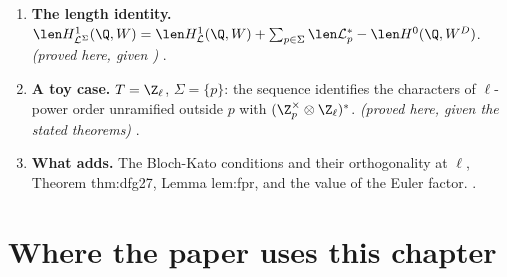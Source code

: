 \begin{sloppypar}
\begin{enumerate}[label=\textbf{\thechapter.\arabic*}]
$H^0(\Q_p,V^D)=0$ for one $p\in\Sigma$, then $0\to H^1_{\mathcal L}(\Q,W)\to H^1_{\mathcal L^\Sigma}(\Q,W)\to\bigoplus_{p\in\Sigma\cup\{\infty\}}(\mathcal L^*_p)^*\to H^0(\Q,W^D)^*\to0$.
\emph{(proved here, given )} .
\item \textbf{The length identity.} $\len H^1_{\mathcal L^\Sigma}(\Q,W)=\len H^1_{\mathcal L}(\Q,W)+\sum_{p\in\Sigma}\len\mathcal L^*_p-\len H^0(\Q,W^D)$. \emph{(proved here, given
)} .
\item \textbf{A toy case.} $T=\Z_\ell$, $\Sigma=\{p\}$: the sequence identifies the characters of $\ell$-power order unramified outside $p$ with $(\Z_p^\times\otimes\Z_\ell)^*$.
\emph{(proved here, given the stated theorems)} .
\item \textbf{What  adds.} The Bloch-Kato conditions and their orthogonality at $\ell$, Theorem thm:dfg27, Lemma lem:fpr, and the value of the Euler factor.
.
\end{enumerate}
\end{sloppypar}

\section*{Where the paper uses this chapter}

